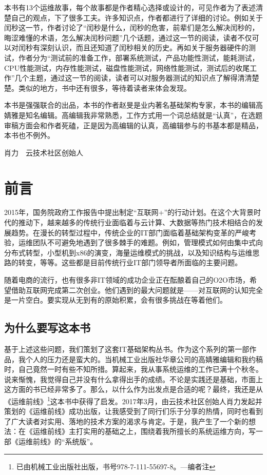 \documentclass[12pt,UTF8]{ctexbook}
\begin{document}
本书有13个运维故事，每个故事都是作者精心选择或设计的，可见作者为了表述清楚自己的观点，下了很多工夫。许多知识点，作者都进行了详细的讨论。例如关于闰秒这一节，作者讨论了“闰秒是什么，闰秒的危害，前辈们是怎么解决闰秒的，晦涩难懂的术语，怎么解决闰秒问题”几个话题，通过这一节的阅读，读者不仅可以对闰秒有深刻认识，而且还知道了闰秒相关的历史。再如关于服务器硬件的测试，作者分为“测试前的准备工作，部署系统测试，产品功能性测试，能耗测试，CPU性能测试，内存性能测试，磁盘性能测试，网络性能测试，测试后的收尾工作”几个主题，通过这一节的阅读，读者可以对服务器测试的知识点了解得清清楚楚。类似的地方，书中还有很多，等待着读者来体会发现。

本书是强强联合的出品，本书的作者赵旻是业内著名基础架构专家，本书的编辑高婧雅是知名编辑。高编辑我非常熟悉，工作方式用一个词总结就是“认真”，在选题审稿方面会和作者死磕，正是因为高编辑的认真，高编辑参与的书基本都是精品，本书也不例外。

肖力　云技术社区创始人

\chapter{前言}

2015年，国务院政府工作报告中提出制定“互联网+”的行动计划。在这个大背景时代的推动下，越来越多的传统行业面临着与云计算、大数据等热门技术相结合的发展趋势。在漫长的转型过程中，传统企业的IT部门面临着基础架构变革的严峻考验，运维团队不可避免地遇到了很多棘手的难题。例如，管理模式如何由集中式向分布式转型，小型机到x86的演变，海量运维模式的挑战，以及知识结构与运维思路的转变，等等。这些都是目前传统行业IT部门领导者所面临的主要问题。

随着电商的流行，也有很多非IT领域的成功企业正在酝酿着自己的O2O市场，希望借助互联网完成第二次创业。他们遇到的最大问题就是——对互联网的认知完全是一片空白。要实现从无到有的原始积累，会有很多挑战在等着他们。

\section{为什么要写这本书}

基于上述这些问题，我们策划了这套IT基础架构丛书。作为这个系列的第一部作品，我个人的压力还是蛮大的。当机械工业出版社华章公司的高婧雅编辑和我约稿时，自己竟然一时有些不知所措。算起来，我从事系统运维的工作已满十个秋冬。说来惭愧，我觉得自己并没有什么拿得出手的成绩。不论是实践还是基础，市面上这方面的书已经非常多了。那么，以什么作为出发点是合适的呢？最终，我还是从《运维前线》\footnote{已由机械工业出版社出版，书号978-7-111-55697-8。—编者注}这本书中获得了启发。2017年3月，由云技术社区创始人肖力发起并策划的《运维前线》成功出版，让我感受到了同行们乐于分享的热情，同时也看到了广大读者对实用、落地的技术方案的渴求与肯定。于是，我产生了一个新的想法：在《运维前线》主打实用的基础之上，围绕着我所擅长的系统运维方向，写一部《运维前线》的“系统版”。
\end{document}
